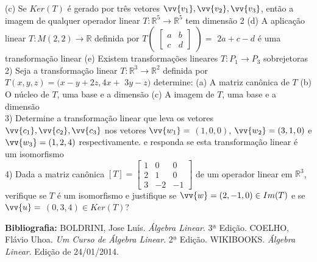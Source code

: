 \documentclass[11pt,a4paper]{article}
\newcommand\tab[1][1.835cm]{\hspace*{#1}}
\newcommand\taba[1][2.55cm]{\hspace*{#1}}
\begin{document}
\begin{flushleft}
\taba (c) Se $Ker(T)$ é gerado por três vetores $\vv{v_1}, \vv{v_2}, \vv{v_3}$, então a imagem de qualquer operador linear $T:\mathbb{R}^5\rightarrow\mathbb{R}^5$ tem dimensão 2\linebreak
\taba (d) A aplicação linear $T:M(2,2)\rightarrow\mathbb{R}$ definida por $T\begin{pmatrix}\begin{bmatrix} a & b \\c & d\end{bmatrix}\end{pmatrix} = $ $2a+c-d$ é uma transformação linear\linebreak
\taba (e) Existem transformações lineares $T:P_1 \rightarrow P_3$ sobrejetoras\linebreak
\\
\tab 2) Seja a transformação linear $T:\mathbb{R}^3 \rightarrow \mathbb{R}^2$ definida por $T(x,y,z) = (x-y+2z,4x+ $ $3y-z)$ determine: \linebreak
\taba(a) A matriz canônica de $T$ \linebreak
\taba(b) O núcleo de $T$, uma base e a dimensão \linebreak
\taba(c) A imagem de $T$, uma base e a dimensão \linebreak
\\
\tab 3) Determine a transformação linear que leva os vetores $\vv{c_1}, \vv{c_2}, \vv{c_3}$ nos vetores $\vv{w_1}=$ $(1,0,0)$, $\vv{w_2}=(3,1,0)$ e $\vv{w_3}=(1,2,4)$ respectivamente. e responda se esta transformação linear é um isomorfismo\linebreak
\\
\tab 4) Dada a matriz canônica $[T]= \begin{bmatrix}
1 & 0 & 0\\ 2 & 1 & 0\\ 3 & -2 & -1 \end{bmatrix}$ de um operador linear em $\mathbb{R}^3$, verifique se $T$ é um isomorfismo e justifique se $\vv{w}=(2,-1,0) \in Im(T)$ e se $\vv{u}= $ $(0,3,4) \in Ker(T)$?\linebreak



%
%
\textbf{Bibliografia: }BOLDRINI, Jose Luís. \textit{Álgebra Linear}. 3ª Edição. \linebreak
\taba COELHO, Flávio Uhoa. \textit{Um Curso de Álgebra Linear}. 2ª Edição.
\taba WIKIBOOKS. \textit{Álgebra Linear}. Edição de 24/01/2014. \linebreak
\end{flushleft}
\end{document}

